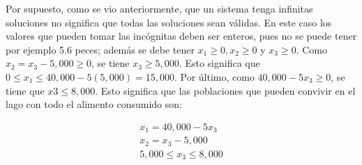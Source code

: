 \documentclass{article}
\begin{document}
Por supuesto, como se vio anteriormente, que un sistema tenga infinitas soluciones no significa que todas las soluciones sean válidas. En este caso los valores que pueden tomar las incógnitas deben ser enteros, pues no se puede tener por ejemplo 5.6 peces; además se debe tener $x_1 \geq 0, x_2 \geq 0$ y $x_3 \geq 0$. Como $x_2 = x_3 - 5,000 \geq 0$, se tiene $x_3 \geq 5,000$. Esto significa que $0 \leq x_1 \leq 40,000 - 5(5,000)= 15,000$. Por último, como $40,000 - 5x_3 \geq 0$, se tiene que $x3 \leq 8,000$. Esto significa que las poblaciones que pueden convivir en el lago con todo el alimento consumido son: 

\begin{equation*}
    \begin{aligned}
        x_1 = 40,000 -5x_3\\
        x_2 = x_3 - 5,000\\
        5,000 \leq x_3 \leq 8,000
    \end{aligned}
\end{equation*}
\end{document}
